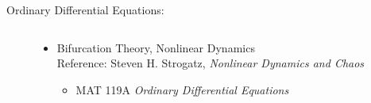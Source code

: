 \documentclass[letterpaper]{article}
\theoremstyle{remark}
\begin{document}
\begin{description}
		\item[Ordinary Differential Equations:] $ $
		\begin{itemize}
		   \item Bifurcation Theory, Nonlinear Dynamics\\
		  	Reference: Steven H. Strogatz, \emph{Nonlinear Dynamics and Chaos}
		  \begin{itemize}
		  \item MAT 119A \emph{Ordinary Differential Equations}
		  \end{itemize}
		  
        \end{itemize}

	\end{description}


\nocite{eiermann_talk}
 

\end{document}

